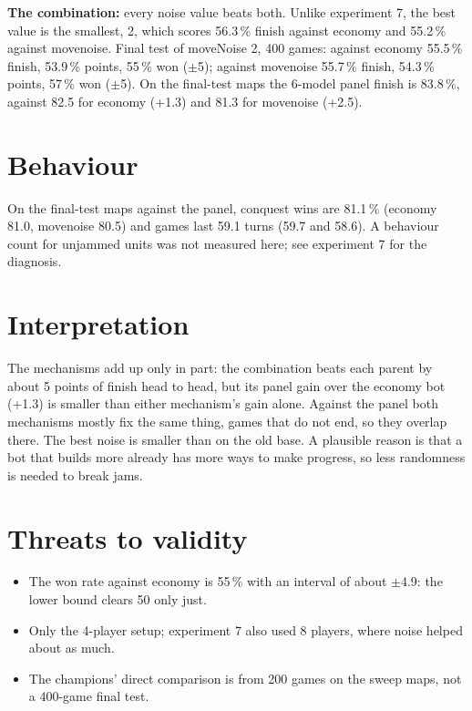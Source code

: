 \documentclass{../polyexp}
\begin{document}
\textbf{The combination:} every noise value beats both. Unlike experiment 7, the best value is the smallest, 2, which scores 56.3\,\% finish against economy and 55.2\,\% against movenoise. Final test of moveNoise 2, 400 games: against economy 55.5\,\% finish, 53.9\,\% points, 55\,\% won ($\pm$5); against movenoise 55.7\,\% finish, 54.3\,\% points, 57\,\% won ($\pm$5). On the final-test maps the 6-model panel finish is 83.8\,\%, against 82.5 for economy (+1.3) and 81.3 for movenoise (+2.5).

\section{Behaviour}
On the final-test maps against the panel, conquest wins are 81.1\,\% (economy 81.0, movenoise 80.5) and games last 59.1 turns (59.7 and 58.6). A behaviour count for unjammed units was not measured here; see experiment 7 for the diagnosis.

\section{Interpretation}
The mechanisms add up only in part: the combination beats each parent by about 5 points of finish head to head, but its panel gain over the economy bot (+1.3) is smaller than either mechanism's gain alone. Against the panel both mechanisms mostly fix the same thing, games that do not end, so they overlap there. The best noise is smaller than on the old base. A plausible reason is that a bot that builds more already has more ways to make progress, so less randomness is needed to break jams.


\section{Threats to validity}
\begin{itemize}
\item The won rate against economy is 55\,\% with an interval of about $\pm$4.9: the lower bound clears 50 only just.
\item Only the 4-player setup; experiment 7 also used 8 players, where noise helped about as much.
\item The champions' direct comparison is from 200 games on the sweep maps, not a 400-game final test.
\end{itemize}
\end{document}
